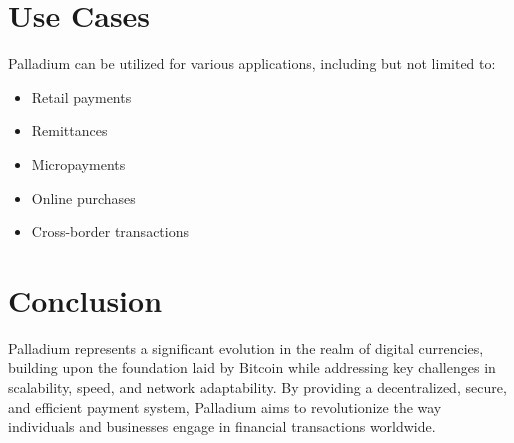 \documentclass[11pt,a4paper]{article}
\begin{document}
\section{Use Cases}
Palladium can be utilized for various applications, including but not limited to:
\begin{itemize}
    \item Retail payments
    \item Remittances
    \item Micropayments
    \item Online purchases
    \item Cross-border transactions
\end{itemize}

\section{Conclusion}
Palladium represents a significant evolution in the realm of digital currencies, building upon the foundation laid by Bitcoin while addressing key challenges in scalability, speed, and network adaptability. By providing a decentralized, secure, and efficient payment system, Palladium aims to revolutionize the way individuals and businesses engage in financial transactions worldwide.
\end{document}
